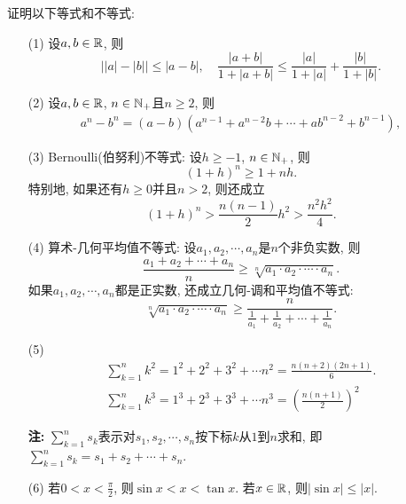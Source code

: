 \documentclass[UTF8,oneside,12pt]{article}  %
\theoremstyle{DingLi1}
\numberwithin{equation}{section}
\theoremstyle{DingLi2}
\newtheorem{example}{\hskip 2em 问题}[section]
\begin{document}
\begin{example}
证明以下等式和不等式:
\begin{itemize}
    \item[(1)] 设$a,b\in \Bbb{R}$, 则
    $$\big||a|-|b|\big|\leq |a-b|,\quad \frac{|a+b|}{1+|a+b|}\leq \frac{|a|}{1+|a|}+\frac{|b|}{1+|b|}.$$

    \item[(2)] 设$a,b\in \Bbb{R}$, $n\in \Bbb{N}_+$且$n\geq 2$, 则
    $$\begin{array}{l}
    a^n-b^n=(a-b)(a^{n-1}+a^{n-2}b+\cdots+ab^{n-2}+b^{n-1}),
    \end{array}$$
    \item[(3)] Bernoulli(伯努利)不等式: 设$h\geq -1$, $n\in \Bbb{N}_+$, 则
        $$(1+h)^n\geq 1+nh.$$
        特别地, 如果还有$h\geq 0$并且$n>2$, 则还成立
        $$(1+h)^n>\frac{n(n-1)}{2}h^2>\frac{n^2h^2}{4}.$$

    \item[(4)] 算术-几何平均值不等式: 设$a_1,a_2,\cdots,a_n$是$n$个非负实数, 则
    $$\frac{a_1+a_2+\cdots+a_n}{n}\geq \sqrt[n]{a_1\cdot a_2\cdot\cdots\cdot a_n}.$$
    如果$a_1,a_2,\cdots,a_n$都是正实数, 还成立几何-调和平均值不等式:
    $$\sqrt[n]{a_1\cdot a_2\cdot\cdots\cdot a_n}\geq \frac{n}{\frac{1}{a_1}+\frac{1}{a_2}+\cdots+\frac{1}{a_n}}.$$
    \item[(5)] $$\begin{array}{l}
    \sum\limits_{k=1}^n k^2=1^2+2^2+3^2+\cdots n^2=\frac{n(n+2)(2n+1)}{6}.\\
    \sum\limits_{k=1}^n k^3=1^3+2^3+3^3+\cdots n^3=\left(\frac{n(n+1)}{2} \right)^2
    \end{array}$$

    \textbf{注:} $\sum\limits_{k=1}^n s_k$表示对$s_1,s_2,\cdots,s_n$按下标$k$从$1$到$n$求和, 即$\sum\limits_{k=1}^n s_k=s_1+s_2+\cdots+s_n$.

    \item[(6)] 若$0<x<\frac{\pi}{2}$, 则$\sin x<x <\tan x$. 若$x\in \Bbb{R}$, 则$|\sin x|\leq |x|$.
    \end{itemize}
\end{example}
\end{document}
